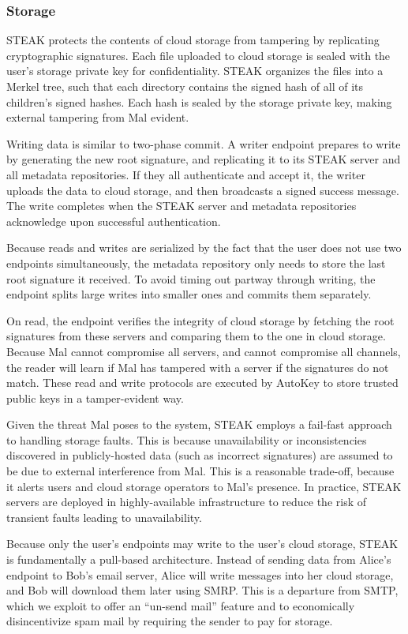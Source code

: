 \subsubsection{Storage}
STEAK protects the contents of cloud storage from tampering by replicating cryptographic signatures.  Each file uploaded to cloud storage is sealed with the user's storage private key for confidentiality.  STEAK organizes the files into a Merkel tree, such that each directory contains the signed hash of all of its children's signed hashes.  Each hash is sealed by the storage private key, making external tampering from Mal evident.

Writing data is similar to two-phase commit.  A writer endpoint prepares to write by generating the new root signature, and replicating it to its STEAK server and all metadata repositories.  If they all authenticate and accept it, the writer uploads the data to cloud storage, and then broadcasts a signed success message.  The write completes when the STEAK server and metadata repositories acknowledge upon successful authentication.

Because reads and writes are serialized by the fact that the user does not use two endpoints simultaneously, the metadata repository only needs to store the last root signature it received.  To avoid timing out partway through writing, the endpoint splits large writes into smaller ones and commits them separately.

On read, the endpoint verifies the integrity of cloud storage by fetching the root signatures from these servers and comparing them to the one in cloud storage.  Because Mal cannot compromise all servers, and cannot compromise all channels, the reader will learn if Mal has tampered with a server if the signatures do not match.  These read and write protocols are executed by AutoKey to store trusted public keys in a tamper-evident way.

Given the threat Mal poses to the system, STEAK employs a fail-fast approach to handling storage faults.  This is because unavailability or inconsistencies discovered in publicly-hosted data (such as incorrect signatures) are assumed to be due to external interference from Mal.  This is a reasonable trade-off, because it alerts users and cloud storage operators to Mal's presence.  In practice, STEAK servers are deployed in highly-available infrastructure to reduce the risk of transient faults leading to unavailability.

Because only the user's endpoints may write to the user's cloud storage, STEAK is fundamentally a pull-based architecture.  Instead of sending data from Alice's endpoint to Bob's email server, Alice will write messages into her cloud storage, and Bob will download them later using SMRP.  This is a departure from SMTP, which we exploit to offer an ``un-send mail'' feature and to economically disincentivize spam mail by requiring the sender to pay for storage.

